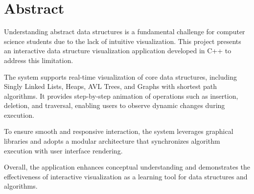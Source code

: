 \section{Abstract}

Understanding abstract data structures is a fundamental challenge for computer science students due to the lack of intuitive visualization. This project presents an interactive data structure visualization application developed in C++ to address this limitation.

The system supports real-time visualization of core data structures, including Singly Linked Lists, Heaps, AVL Trees, and Graphs with shortest path algorithms. It provides step-by-step animation of operations such as insertion, deletion, and traversal, enabling users to observe dynamic changes during execution.

To ensure smooth and responsive interaction, the system leverages graphical libraries and adopts a modular architecture that synchronizes algorithm execution with user interface rendering.

Overall, the application enhances conceptual understanding and demonstrates the effectiveness of interactive visualization as a learning tool for data structures and algorithms.
